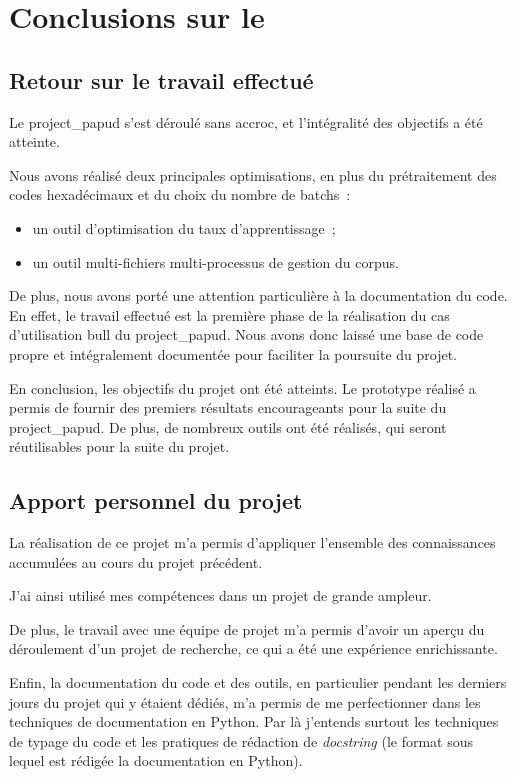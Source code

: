 \chapter{Conclusions sur le }

\section{Retour sur le travail effectué}
Le \gls{project_papud} s'est déroulé sans accroc, et l'intégralité des objectifs a été atteinte.

Nous avons réalisé deux principales optimisations, en plus du prétraitement des codes hexadécimaux et du choix du nombre de \glspl{batch}~:
\begin{itemize}
	\item un outil d'optimisation du taux d'apprentissage~;
	\item un outil multi-fichiers multi-processus de gestion du corpus.
\end{itemize} %
\hspace{1em}

De plus, nous avons porté une attention particulière à la documentation du code.
En effet, le travail effectué est la première phase de la réalisation du cas d'utilisation \gls{bull} du \gls{project_papud}. Nous avons donc laissé une base de code propre et intégralement documentée pour faciliter la poursuite du projet.

En conclusion, les objectifs du projet ont été atteints. Le prototype réalisé a permis de fournir des premiers résultats encourageants pour la suite du \gls{project_papud}. De plus, de nombreux outils ont été réalisés, qui seront réutilisables pour la suite du projet.

\section{Apport personnel du projet}
La réalisation de ce projet m'a permis d'appliquer l'ensemble des connaissances accumulées au cours du projet précédent.

J'ai ainsi utilisé mes compétences dans un projet de grande ampleur.

De plus, le travail avec une équipe de projet m'a permis d'avoir un aperçu du déroulement d'un projet de recherche, ce qui a été une expérience enrichissante.

Enfin, la documentation du code et des outils, en particulier pendant les derniers jours du projet qui y étaient dédiés, m'a permis de me perfectionner dans les techniques de documentation en Python.
Par là j'entends surtout les techniques de typage du code \autocite{pep483,pep484} et les pratiques de rédaction de \textit{docstring} (le format sous lequel est rédigée la documentation en Python).

